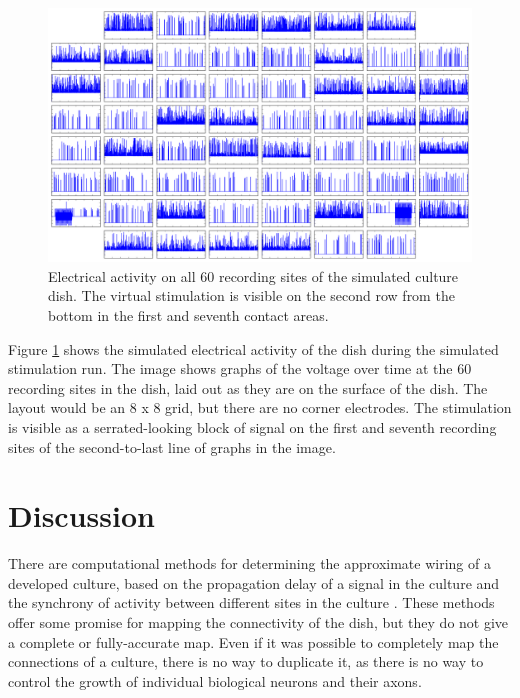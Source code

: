 \documentclass[letterpaper]{article}
\begin{document}
\begin{figure}
	\centering
	\includegraphics[width=\linewidth]{labview_2014-3-18-12:22:52_6-voltages.png}
	\caption{Electrical activity on all 60 recording sites of the simulated culture dish. The virtual stimulation is visible on the second row from the bottom in the first and seventh contact areas.}
	\label{fig:simulated_activity}
\end{figure}

Figure \ref{fig:simulated_activity} shows the simulated electrical activity of the dish during the simulated stimulation run. 
The image shows graphs of the voltage over time at the 60 recording sites in the dish, laid out as they are on the surface of the dish.
The layout would be an 8 x 8 grid, but there are no corner electrodes.
The stimulation is visible as a serrated-looking block of signal on the first and seventh recording sites of the second-to-last line of graphs in the image.

\section{Discussion}

There are computational methods for determining the approximate wiring of a developed culture, based on the propagation delay of a signal in the culture and the synchrony of activity between different sites in the culture  \cite{erickson2008caged,esposti2008estimation}. 
These methods offer some promise for mapping the connectivity of the dish, but they do not give a complete or fully-accurate map. 
Even if it was possible to completely map the connections of a culture, there is no way to duplicate it, as there is no way to control the growth of individual biological neurons and their axons. 



\end{document}
